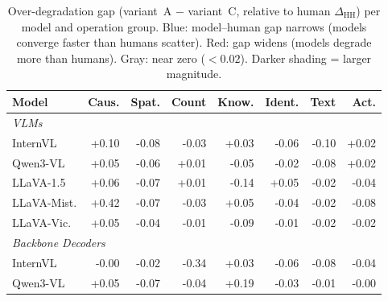 \begin{table}[t]
\centering
\small
\setlength{\tabcolsep}{3.5pt}
\caption{Over-degradation gap (variant~A $-$ variant~C, relative to human $\Delta_{\text{HH}}$) per model and operation group. \colorbox{blue!20}{Blue}: model--human gap narrows (models converge faster than humans scatter). \colorbox{red!20}{Red}: gap widens (models degrade more than humans). \colorbox{gray!10}{Gray}: near zero ($<0.02$). Darker shading = larger magnitude.}
\label{tab:op_overdeg_per_model}
\begin{tabular}{lrrrrrrr}
\toprule
\textbf{Model} & \textbf{Caus.} & \textbf{Spat.} & \textbf{Count} & \textbf{Know.} & \textbf{Ident.} & \textbf{Text} & \textbf{Act.} \\
\midrule
\multicolumn{8}{l}{\textit{VLMs}} \\
InternVL & \cellcolor{blue!13}+0.10 & \cellcolor{red!10}-0.08 & \cellcolor{red!10}-0.03 & \cellcolor{blue!10}+0.03 & \cellcolor{red!10}-0.06 & \cellcolor{red!12}-0.10 & \cellcolor{blue!10}+0.02 \\
Qwen3-VL & \cellcolor{blue!10}+0.05 & \cellcolor{red!10}-0.06 & \cellcolor{gray!10}+0.01 & \cellcolor{red!10}-0.05 & \cellcolor{red!10}-0.02 & \cellcolor{red!10}-0.08 & \cellcolor{blue!10}+0.02 \\
LLaVA-1.5 & \cellcolor{blue!10}+0.06 & \cellcolor{red!10}-0.07 & \cellcolor{gray!10}+0.01 & \cellcolor{red!18}-0.14 & \cellcolor{blue!10}+0.05 & \cellcolor{red!10}-0.02 & \cellcolor{red!10}-0.04 \\
LLaVA-Mist. & \cellcolor{blue!40}+0.42 & \cellcolor{red!10}-0.07 & \cellcolor{red!10}-0.03 & \cellcolor{blue!10}+0.05 & \cellcolor{red!10}-0.04 & \cellcolor{red!10}-0.02 & \cellcolor{red!11}-0.08 \\
LLaVA-Vic. & \cellcolor{blue!10}+0.05 & \cellcolor{red!10}-0.04 & \cellcolor{gray!10}-0.01 & \cellcolor{red!11}-0.09 & \cellcolor{gray!10}-0.01 & \cellcolor{gray!10}-0.02 & \cellcolor{gray!10}-0.02 \\
\midrule
\multicolumn{8}{l}{\textit{Backbone Decoders}} \\
InternVL & \cellcolor{gray!10}-0.00 & \cellcolor{red!10}-0.02 & \cellcolor{red!40}-0.34 & \cellcolor{blue!10}+0.03 & \cellcolor{red!10}-0.06 & \cellcolor{red!10}-0.08 & \cellcolor{red!10}-0.04 \\
Qwen3-VL & \cellcolor{blue!10}+0.05 & \cellcolor{red!10}-0.07 & \cellcolor{red!10}-0.04 & \cellcolor{blue!25}+0.19 & \cellcolor{red!10}-0.03 & \cellcolor{gray!10}-0.01 & \cellcolor{gray!10}-0.00 \\

\end{tabular}
\end{table}
